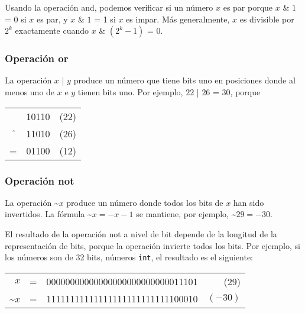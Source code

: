 Usando la operación and, podemos verificar si un número
$x$ es par porque
$x$ \& $1$ = 0 si $x$ es par, y
$x$ \& $1$ = 1 si $x$ es impar.
Más generalmente, $x$ es divisible por $2^k$
exactamente cuando $x$ \& $(2^k-1)$ = 0.

\subsubsection{Operación or}

\index{|}

La operación  $x$ | $y$ produce un número
que tiene bits uno en posiciones donde al menos uno
de $x$ e $y$ tienen bits uno.
Por ejemplo, $22$ | $26$ = 30, porque


\begin{center}
    \begin{tabular}{rrr}
               & 10110 & (22) \\
        $\XOR$ & 11010 & (26) \\
        \hline
        =      & 01100 & (12) \\
    \end{tabular}
\end{center}

\subsubsection{Operación not}


La operación  \textasciitilde$x$
produce un número donde todos los bits de $x$
han sido invertidos.
La fórmula \textasciitilde$x = -x-1$ se mantiene,
por ejemplo, \textasciitilde$29 = -30$.

El resultado de la operación not a nivel de bit
depende de la longitud de la representación de bits,
porque la operación invierte todos los bits.
Por ejemplo, si los números son de 32 bits,
números \texttt{int}, el resultado es el siguiente:

\begin{center}
    \begin{tabular}{rrrr}
        $x$                & = & 00000000000000000000000000011101 & (29)    \\
        \textasciitilde$x$ & = & 11111111111111111111111111100010 & $(-30)$ \\
    \end{tabular}
\end{center}

